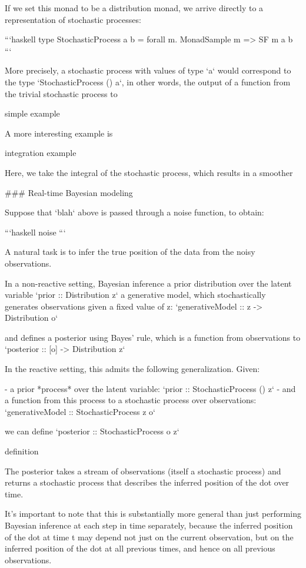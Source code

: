 If we set this monad to be a distribution monad, we arrive directly to a representation of stochastic processes:

```haskell
type StochasticProcess a b = forall m. MonadSample m => SF m a b
```

More precisely, a stochastic process with values of type `a` would correspond to the type `StochasticProcess () a`, in other words, the output of a function from the trivial stochastic process to

simple example

A more interesting example is

integration example

Here, we take the integral of the stochastic process, which results in a smoother

### Real-time Bayesian modeling

Suppose that `blah` 
    above is passed through a noise function, to obtain:

```haskell
noise
```

A natural task is to infer the true position of the data from the noisy observations.

In a non-reactive setting, Bayesian inference 
    a prior distribution over the latent variable `prior :: Distribution z` 
    a generative model, which stochastically generates observations given a fixed value of z: `generativeModel :: z -> Distribution o`

and defines a posterior using Bayes' rule, which is a function from observations to `posterior :: [o] -> Distribution z`

In the reactive setting, this admits the following generalization. Given:

- a prior *process* over the latent variable: `prior :: StochasticProcess () z`
- and a function from this process to a stochastic process over observations: `generativeModel :: StochasticProcess z o`

we can define `posterior :: StochasticProcess o z`

definition 

The posterior takes a stream of observations (itself a stochastic process) and returns a stochastic process that describes the inferred position of the dot over time.

It's important to note that this is substantially more general than just performing Bayesian inference at each step in time separately, because the inferred position of the dot at time t may depend not just on the current observation, but on the inferred position of the dot at all previous times, and hence on all previous observations.

